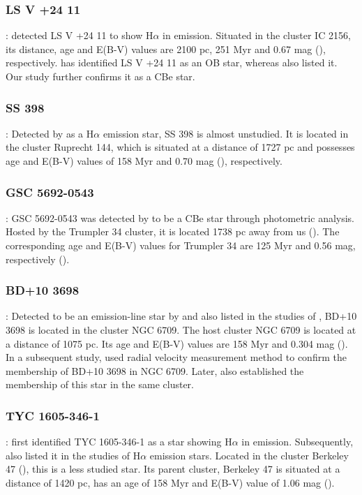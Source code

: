 \documentclass{jaa}
\begin{document}
\subsubsection{LS V +24 11}:
\cite{1999Kohoutek} detected LS V +24 11 to show H$\alpha$ in emission.
Situated in the cluster IC 2156, its distance, age and E(B-V) values are 2100 pc, 251 Myr and 0.67 mag (\citealt{2009Tadross}), respectively. \cite{2003Reed} has identified LS V +24 11 as an OB star, whereas \cite{2015Armstrong} also listed it. Our study further confirms it as a CBe star.

\subsubsection{SS 398}:
Detected by \cite{1977Stephenson} as a H$\alpha$ emission star, SS 398 is almost unstudied. It is located in the cluster Ruprecht 144, which is situated at a distance of 1727 pc and possesses age and E(B-V) values of 158 Myr and 0.70 mag (\citealt{2019Clari}), respectively.

\subsubsection{GSC 5692-0543}:
GSC 5692-0543 was detected by \cite{2005McSwain} to be a CBe star through photometric analysis. Hosted by the Trumpler 34 cluster, it is located 1738 pc away from us (\citealt{2005McSwain}). The corresponding age and E(B-V) values for Trumpler 34 are 125 Myr and 0.56 mag, respectively (\citealt{2005McSwain}).

\subsubsection{BD+10 3698}:
Detected to be an emission-line star by \cite{1997Kohoutek} and also listed in the studies of \cite{1999Kohoutek}, BD+10 3698 is located in the cluster NGC 6709. The host cluster NGC 6709 is located at a distance of 1075 pc. Its age and E(B-V) values are 158 Myr and 0.304 mag (\citealt{1999Subramaniam}). In a subsequent study, \cite{2008Mermilliod} used radial velocity measurement method to confirm the membership of BD+10 3698 in NGC 6709. Later, \cite{2018Cantat} also established the membership of this star in the same cluster.

\subsubsection{TYC 1605-346-1}:
\cite{1997Kohoutek} first identified TYC 1605-346-1 as a star showing H$\alpha$ in emission. Subsequently, \cite{1999Kohoutek} also listed it in the studies of H$\alpha$ emission stars. Located in the cluster Berkeley 47 (\citealt{2010Krone, 2018Cantat}), this is a less studied star. 
Its parent cluster, Berkeley 47 is situated at a distance of 1420 pc, has
 an age of 158 Myr and E(B-V) value of 1.06 mag (\citealt{2010Subramaniam}).
\end{document}
